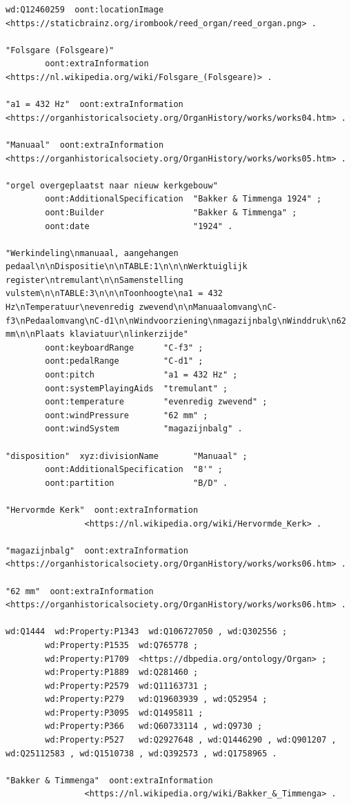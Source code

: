 \begin{lstlisting}[caption={Part14\_000Folsgare}]
wd:Q12460259  oont:locationImage  <https://staticbrainz.org/irombook/reed_organ/reed_organ.png> .

"Folsgare (Folsgeare)"
        oont:extraInformation  <https://nl.wikipedia.org/wiki/Folsgare_(Folsgeare)> .

"a1 = 432 Hz"  oont:extraInformation  <https://organhistoricalsociety.org/OrganHistory/works/works04.htm> .

"Manuaal"  oont:extraInformation  <https://organhistoricalsociety.org/OrganHistory/works/works05.htm> .

"orgel overgeplaatst naar nieuw kerkgebouw"
        oont:AdditionalSpecification  "Bakker & Timmenga 1924" ;
        oont:Builder                  "Bakker & Timmenga" ;
        oont:date                     "1924" .

"Werkindeling\nmanuaal, aangehangen pedaal\n\nDispositie\n\nTABLE:1\n\n\nWerktuiglijk register\ntremulant\n\nSamenstelling vulstem\n\nTABLE:3\n\n\nToonhoogte\na1 = 432 Hz\nTemperatuur\nevenredig zwevend\n\nManuaalomvang\nC-f3\nPedaalomvang\nC-d1\n\nWindvoorziening\nmagazijnbalg\nWinddruk\n62 mm\n\nPlaats klaviatuur\nlinkerzijde"
        oont:keyboardRange      "C-f3" ;
        oont:pedalRange         "C-d1" ;
        oont:pitch              "a1 = 432 Hz" ;
        oont:systemPlayingAids  "tremulant" ;
        oont:temperature        "evenredig zwevend" ;
        oont:windPressure       "62 mm" ;
        oont:windSystem         "magazijnbalg" .

"disposition"  xyz:divisionName       "Manuaal" ;
        oont:AdditionalSpecification  "8'" ;
        oont:partition                "B/D" .

"Hervormde Kerk"  oont:extraInformation
                <https://nl.wikipedia.org/wiki/Hervormde_Kerk> .

"magazijnbalg"  oont:extraInformation  <https://organhistoricalsociety.org/OrganHistory/works/works06.htm> .

"62 mm"  oont:extraInformation  <https://organhistoricalsociety.org/OrganHistory/works/works06.htm> .

wd:Q1444  wd:Property:P1343  wd:Q106727050 , wd:Q302556 ;
        wd:Property:P1535  wd:Q765778 ;
        wd:Property:P1709  <https://dbpedia.org/ontology/Organ> ;
        wd:Property:P1889  wd:Q281460 ;
        wd:Property:P2579  wd:Q11163731 ;
        wd:Property:P279   wd:Q19603939 , wd:Q52954 ;
        wd:Property:P3095  wd:Q1495811 ;
        wd:Property:P366   wd:Q60733114 , wd:Q9730 ;
        wd:Property:P527   wd:Q2927648 , wd:Q1446290 , wd:Q901207 , wd:Q25112583 , wd:Q1510738 , wd:Q392573 , wd:Q1758965 .

"Bakker & Timmenga"  oont:extraInformation
                <https://nl.wikipedia.org/wiki/Bakker_&_Timmenga> .
\end{lstlisting}

